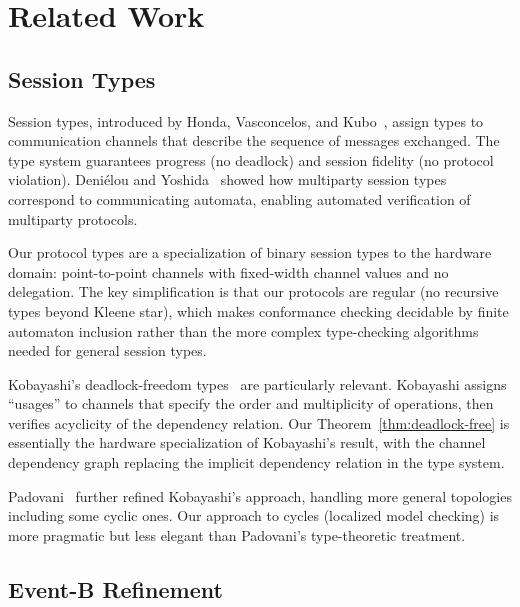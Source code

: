 \documentclass[11pt]{article}
\begin{document}
\section{Related Work}
\label{sec:related}

\subsection{Session Types}

Session types, introduced by Honda, Vasconcelos, and
Kubo~\cite{honda1998}, assign types to communication channels that
describe the sequence of messages exchanged.  The type system
guarantees progress (no deadlock) and session fidelity (no protocol
violation).  Deni\'elou and Yoshida~\cite{yoshida2012} showed
how multiparty session types correspond to communicating automata,
enabling automated verification of multiparty protocols.

Our protocol types are a specialization of binary session types to the
hardware domain: point-to-point channels with fixed-width channel
values and no delegation.  The key simplification is that our protocols are
regular (no recursive types beyond Kleene star), which makes
conformance checking decidable by finite automaton inclusion rather
than the more complex type-checking algorithms needed for general
session types.

Kobayashi's deadlock-freedom types~\cite{kobayashi2006} are
particularly relevant.  Kobayashi assigns ``usages'' to channels that
specify the order and multiplicity of operations, then verifies
acyclicity of the dependency relation.  Our
Theorem~\ref{thm:deadlock-free} is essentially the hardware
specialization of Kobayashi's result, with the channel dependency
graph replacing the implicit dependency relation in the type system.

Padovani~\cite{padovani2014} further refined Kobayashi's approach,
handling more general topologies including some cyclic ones.  Our
approach to cycles (localized model checking) is more pragmatic but
less elegant than Padovani's type-theoretic treatment.

\subsection{Event-B Refinement}
\end{document}
